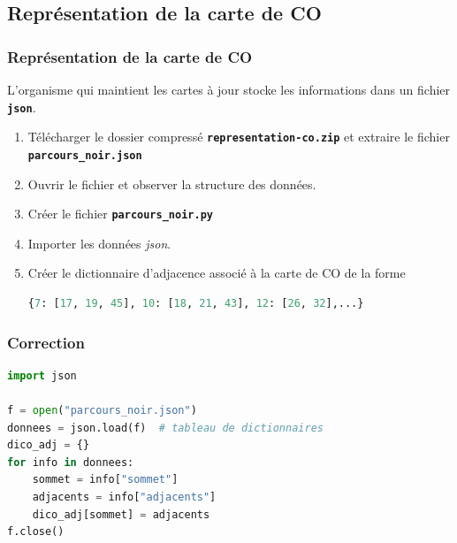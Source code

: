 \documentclass[svgnames,11pt]{beamer}
\begin{document}
\subsection{Représentation de la carte de CO}
\begin{frame}[fragile]
    \frametitle{Représentation de la carte de CO}

    \begin{activite}
        L'organisme qui maintient les cartes à jour stocke les informations dans un fichier \textbf{\texttt{json}}. 
        \begin{enumerate}
            \item Télécharger le dossier compressé \textbf{\texttt{representation-co.zip}} et extraire le fichier \textbf{\texttt{parcours\_noir.json}}
            \item Ouvrir le fichier et observer la structure des données.
            \item Créer le fichier \textbf{\texttt{parcours\_noir.py}}
            \item Importer les données \emph{json}.
            \item Créer le dictionnaire d'adjacence associé à la carte de CO de la forme
            \begin{center}
            \begin{lstlisting}[language=Python , basicstyle=\ttfamily\small, xleftmargin=2em, xrightmargin=2em]
{7: [17, 19, 45], 10: [18, 21, 43], 12: [26, 32],...}
\end{lstlisting}
            \end{center}
        \end{enumerate}
    \end{activite}

\end{frame}
\begin{frame}[fragile]
    \frametitle{Correction}

\begin{center}
\begin{lstlisting}[language=Python , basicstyle=\ttfamily\small, xleftmargin=1em, xrightmargin=0em]
import json

f = open("parcours_noir.json")
donnees = json.load(f)  # tableau de dictionnaires
dico_adj = {}
for info in donnees:
    sommet = info["sommet"]
    adjacents = info["adjacents"]
    dico_adj[sommet] = adjacents
f.close()
\end{lstlisting}
\end{center}    

\end{frame}
\end{document}
